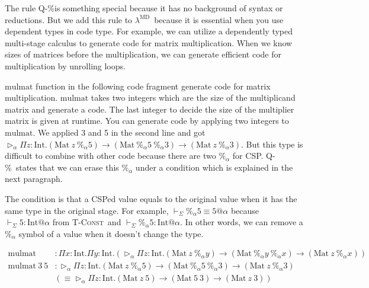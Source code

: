 \documentclass[runningheads]{llncs}
\newcommand{\LMD}{$\lambda^{\textrm{MD}}$\xspace}
\newcommand{\V}{\vdash_\Sigma}
\newcommand{\TW}{\triangleright}
\newcommand{\E}{\equiv}
\newcommand{\TConst}{\textsc{T-Const}}
\newcommand{\QPercent}{\textsc{Q-\%}}
\newcommand{\I}{\textrm{Int}}
\newcommand{\M}{\textrm{Mat}}
\begin{document}
									The rule \QPercent is something special because it has no background of syntax or reductions.
									But we add this rule to \LMD\ because it is essential when you use dependent types in code type.
									For example, we can utilize a dependently typed multi-stage calculus to generate code for matrix multiplication.
									When we know sizes of matrices before the multiplication,
									we can generate efficient code for multiplication by unrolling loops.
									
									
									$\text{mulmat}$ function in the following code fragment generate code for matrix multiplication.
									$\text{mulmat}$ takes two integers which are the size of the multiplicand matrix and generate a code.
									The last integer to decide the size of the multiplier matrix is given at runtime.
									You can generate code by applying two integers to $\text{mulmat}$.
									We applied 3 and 5 in the second line and got $\TW_\alpha \Pi z:\I.(\M\ z\ \%_\alpha 5) \to (\M\ \%_\alpha 5\ \%_\alpha 3) \to (\M\ z\ \%_\alpha 3)$.
									But this type is difficult to combine with other code because there are two $\%_\alpha$ for CSP.
									\QPercent\ states that we can erase this $\%_\alpha$ under a condition which is explained in the next paragraph.
									
									The condition is that a CSPed value equals to the original value when it has the same type in the original stage.
									For example, $\V \%_\alpha 5 \E 5 @ \alpha$ because $ \V 5 : \I @ \alpha $ from \TConst\ and  $ \V \%_\alpha 5 : \I @ \alpha$.
									In other words, we can remove a $\%_\alpha$ symbol of a value when it doesn't change the type.
									
									{
										\begin{align*}
											\text{mulmat}       & : \Pi x:\I.\Pi y:\I.(\TW_\alpha \Pi z:\I.(\M\ z\ \%_\alpha y) \to (\M\ \%_\alpha y\ \%_\alpha x) \to (\M\ z\ \%_\alpha x)) \\
											\text{mulmat}\ 3\ 5 & : \TW_\alpha \Pi z:\I.(\M\ z\ \%_\alpha 5) \to (\M\ \%_\alpha 5\ \%_\alpha 3) \to (\M\ z\ \%_\alpha 3)                     \\
											                    & (\E \TW_\alpha \Pi z:\I.(\M\ z\ 5) \to (\M\ 5\ 3) \to (\M\ z\ 3) )                                                         \\
										\end{align*}
									}
									
\end{document}
